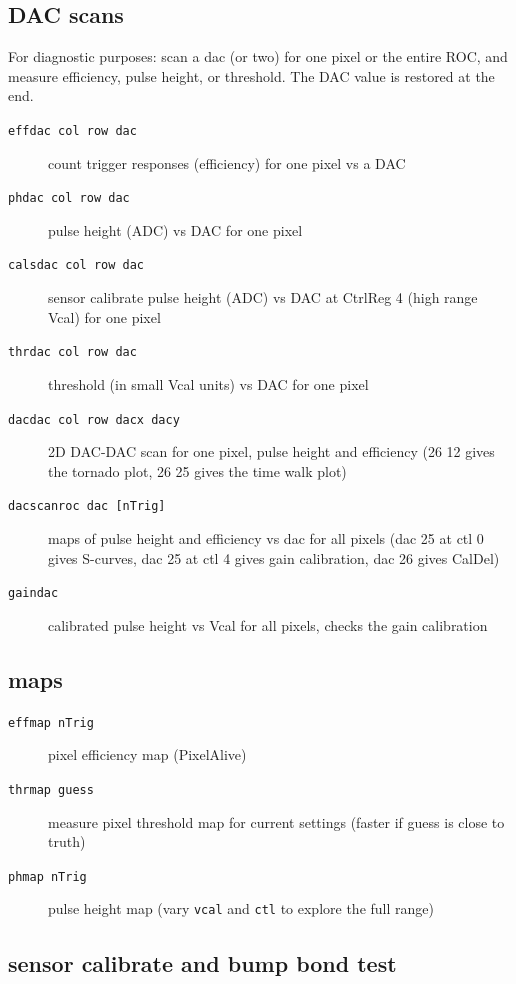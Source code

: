 \documentclass[english]{article}
\begin{document}
\subsection{DAC scans}

For diagnostic purposes: scan a dac (or two) for one pixel or the
entire ROC, and measure efficiency, pulse height, or threshold. The
DAC value is restored at the end. 
\begin{description}
\item [\texttt{effdac\ col\ row\ dac}] count trigger responses
(efficiency) for one pixel vs a DAC 
\item [\texttt{phdac\ col\ row\ dac}] pulse height (ADC) vs DAC
for one pixel 
\item [\texttt{calsdac\ col\ row\ dac}] sensor calibrate pulse height (ADC)
vs DAC at CtrlReg 4 (high range Vcal) for one pixel 
\item [\texttt{thrdac\ col\ row\ dac}] threshold (in small
Vcal units) vs DAC for one pixel 
\item [\texttt{dacdac\ col\ row\ dacx\ dacy}] 2D DAC-DAC
scan for one pixel, pulse height and efficiency (26 12 gives the tornado
plot, 26 25 gives the time walk plot) 
\item [\texttt{dacscanroc\ dac\ {[}nTrig{]}}] maps of pulse
height and efficiency vs dac for all pixels (dac 25 at ctl 0 gives
S-curves, dac 25 at ctl 4 gives gain calibration, dac 26 gives CalDel) 
\item [\texttt{gaindac}] calibrated pulse height vs Vcal for all pixels,
checks the gain calibration 
\end{description}

\subsection{maps}
\begin{description}
\item [\texttt{effmap\ nTrig}] pixel efficiency map (PixelAlive) 
\item [\texttt{thrmap\ guess}] measure pixel threshold map for
current settings (faster if guess is close to truth) 
\item [\texttt{phmap\ nTrig}] pulse height map (vary \texttt{vcal}
and \texttt{ctl} to explore the full range) 
\end{description}

\subsection{sensor calibrate and bump bond test}
\end{document}
